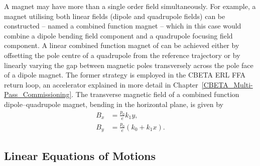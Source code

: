 \documentclass[../main.tex]{subfiles}
\begin{document}
A magnet may have more than a single order field simultaneously. For example, a magnet utilising both linear fields (dipole and quadrupole fields) can be constructed -- named a combined function magnet -- which in this case would combine a dipole bending field component and a quadrupole focusing field component. A linear combined function magnet of can be achieved either by offsetting the pole centre of a quadrupole from the reference trajectory or by linearly varying the gap between magnetic poles transversely across the pole face of a dipole magnet. The former strategy is employed in the CBETA ERL FFA return loop, an accelerator explained in more detail in Chapter~\ref{CBETA_Multi-Pass_Commissioning}. The transverse magnetic field of a combined function dipole--quadrupole magnet, bending in the horizontal plane, is given by 
\begin{align}
B_{x} &= \frac{p_{0}}{e}k_{1}y, \nonumber\\
B_{y} &= \frac{p_{0}}{e}\left(k_{0}+k_{1}x\right).
\label{eq:combined_function_field}    
\end{align}

\subsection{Linear Equations of Motions}
\label{sec:equations_of_motion}
\end{document}
